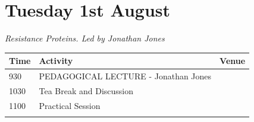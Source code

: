 \documentclass[12pt,]{book}
\theoremstyle{definition}
\theoremstyle{definition}
\theoremstyle{remark}
\begin{document}
\section*{Tuesday 1st August}\label{tuesday-1st-august}

\emph{Resistance Proteins. Led by Jonathan Jones}

\begin{longtable}[]{@{}lll@{}}
\toprule
\begin{minipage}[b]{0.09\columnwidth}\raggedright\strut
Time\strut
\end{minipage} & \begin{minipage}[b]{0.39\columnwidth}\raggedright\strut
Activity\strut
\end{minipage} & \begin{minipage}[b]{0.39\columnwidth}\raggedright\strut
Venue\strut
\end{minipage}\tabularnewline
\midrule
\endhead
\begin{minipage}[t]{0.09\columnwidth}\raggedright\strut
930\strut
\end{minipage} & \begin{minipage}[t]{0.39\columnwidth}\raggedright\strut
PEDAGOGICAL LECTURE - Jonathan Jones\strut
\end{minipage} & \begin{minipage}[t]{0.39\columnwidth}\raggedright\strut
\strut
\end{minipage}\tabularnewline
\begin{minipage}[t]{0.09\columnwidth}\raggedright\strut
1030\strut
\end{minipage} & \begin{minipage}[t]{0.39\columnwidth}\raggedright\strut
Tea Break and Discussion\strut
\end{minipage} & \begin{minipage}[t]{0.39\columnwidth}\raggedright\strut
\strut
\end{minipage}\tabularnewline
\begin{minipage}[t]{0.09\columnwidth}\raggedright\strut
1100\strut
\end{minipage} & \begin{minipage}[t]{0.39\columnwidth}\raggedright\strut
Practical Session\strut
\end{minipage} & \begin{minipage}[t]{0.39\columnwidth}\raggedright\strut
\strut
\end{minipage}\tabularnewline
\begin{minipage}[t]{0.09\columnwidth}\raggedright\strut

\end{minipage}
\end{longtable}
\end{document}

